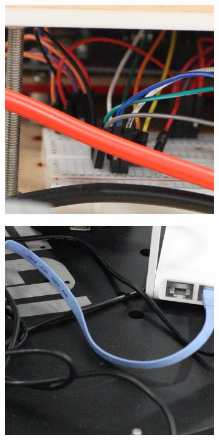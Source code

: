 \begin{figure}
\begin{subfigure}[t]{0.19\textwidth}
    \end{subfigure}
    \hfill
    \begin{subfigure}[t]{0.19\textwidth}
        \centering
        \includegraphics[width=1\textwidth]{images/dataset/Canon5D2_5_160_6400_circuit_11_real.JPG}
    \end{subfigure}
    \hfill
    \begin{subfigure}[t]{0.19\textwidth}
        \centering
        \includegraphics[width=1\textwidth]{images/dataset/Canon5D2_5_160_6400_reciever_1_real.JPG}

\end{subfigure}
\end{figure}

